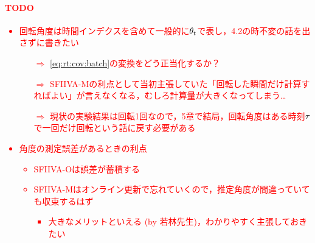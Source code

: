 \documentclass[sip,biber]{now-journal}
\newcommand{\todo}[1]{\textcolor{red}{#1}}
\begin{document}
\todo{%
  \paragraph{TODO}
  \begin{itemize}
    \item 回転角度は時間インデクスを含めて一般的に$\theta _{t}$で表し，4.2の時不変の話を出さずに書きたい
    \begin{itemize}
      \item[$\Rightarrow$] \eqref{eq:rt:cov:batch}の変換をどう正当化するか？
      \item[$\Rightarrow$] SFIIVA-Mの利点として当初主張していた「回転した瞬間だけ計算すればよい」が言えなくなる，むしろ計算量が大きくなってしまう…
      \item[$\Rightarrow$] 現状の実験結果は回転1回なので，5章で結局，回転角度はある時刻$\tau$で一回だけ回転という話に戻す必要がある
    \end{itemize}
  \item 角度の測定誤差があるときの利点
    \begin{itemize}
      \item SFIIVA-Oは誤差が蓄積する
      \item SFIIVA-Mはオンライン更新で忘れていくので，推定角度が間違っていても収束するはず
        \begin{itemize}
          \item 大きなメリットといえる (by 若林先生)，わかりやすく主張しておきたい
        \end{itemize}
    \end{itemize}
\end{itemize}
}
\end{document}
